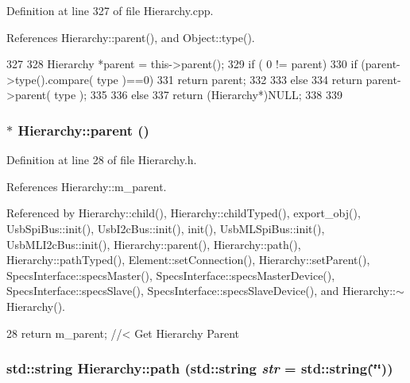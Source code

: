 Definition at line 327 of file Hierarchy.cpp.

References Hierarchy::parent(), and Object::type().


\begin{DoxyCode}
327                                             {
328   Hierarchy *parent = this->parent();
329   if ( 0 != parent){
330     if (parent->type().compare( type )==0) {
331       return parent;
332     }
333     else
334       return parent->parent( type );
335   }
336   else {
337     return (Hierarchy*)NULL;
338   }
339 }
\end{DoxyCode}
\hypertarget{classHierarchy_a1c7bec8257e717f9c1465e06ebf845fc}{
\subsubsection[{parent}]{$\ast$ Hierarchy::parent ()}}
\label{classHierarchy_a1c7bec8257e717f9c1465e06ebf845fc}


Definition at line 28 of file Hierarchy.h.

References Hierarchy::m\_\-parent.

Referenced by Hierarchy::child(), Hierarchy::childTyped(), export\_\-obj(), UsbSpiBus::init(), UsbI2cBus::init(), init(), UsbMLSpiBus::init(), UsbMLI2cBus::init(), Hierarchy::parent(), Hierarchy::path(), Hierarchy::pathTyped(), Element::setConnection(), Hierarchy::setParent(), SpecsInterface::specsMaster(), SpecsInterface::specsMasterDevice(), SpecsInterface::specsSlave(), SpecsInterface::specsSlaveDevice(), and Hierarchy::$\sim$Hierarchy().


\begin{DoxyCode}
28 { return m_parent; }  //< Get Hierarchy Parent
\end{DoxyCode}
\hypertarget{classHierarchy_aa7990fa7caf132d83e361ce033c6c65a}{
\subsubsection[{path}]{\setlength{\rightskip}{0pt plus 5cm}std::string Hierarchy::path (std::string {\em str} = {\ttfamily std::string(\char`\"{}\char`\"{})})}}
\label{classHierarchy_aa7990fa7caf132d83e361ce033c6c65a}


